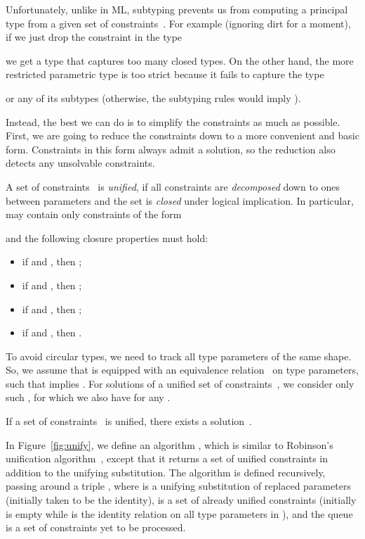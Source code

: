 \documentclass{LMCS}
\begin{document}
Unfortunately, unlike in ML,
subtyping prevents us from computing a principal type from a given set of constraints~\cite{pottier1998type}.
For example (ignoring dirt for a moment), if we just drop the constraint in the type

we get a type that captures too many closed types.
On the other hand, the more restricted parametric type  is
too strict because it fails to capture the type

or any of its subtypes (otherwise, the subtyping rules would imply ).

Instead, the best we can do is to simplify the constraints as much as possible.
First, we are going to reduce the constraints down to a more convenient and basic form.
Constraints in this form always admit a solution,
so the reduction also detects any unsolvable constraints.

\begin{defi}
A set of constraints~ is \emph{unified},
if all constraints are \emph{decomposed} down to ones between parameters
and the set is \emph{closed} under logical implication.
In particular,  may contain only constraints of the form

and the following closure properties must hold:
\begin{itemize}
\item
  if  and ,
  then ;
\item
  if 
  and ,
  then ;
\item
  if 
  and ,
  then ;
\item
  if  and ,
  then .
\end{itemize}
To avoid circular types, we need to track all type parameters of the same shape.
So, we assume that  is equipped with an equivalence relation~
on type parameters, such that  implies .
For solutions of a unified set of constraints~, we consider only such ,
for which we also have  for any .
\end{defi}

\begin{lem}
\label{lem:unify}
If a set of constraints~ is unified, there exists a solution~.
\end{lem}

In Figure~\ref{fig:unify}, we define an algorithm ,
which is similar to Robinson's unification algorithm~\cite[p.~327]{pierce2002types},
except that it returns a set of unified constraints in addition to the unifying substitution.
The algorithm is defined recursively, passing around a triple , where
 is a unifying substitution of replaced parameters (initially taken to be the identity),
 is a set of already unified constraints (initially  is empty while  is the identity relation on all type parameters in ), and
the queue  is a set of constraints yet to be processed.
\end{document}
